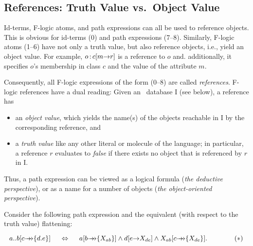\subsection{References: Truth Value vs.\ Object Value}\label{sec-references}

Id-terms, F-logic atoms, and path expressions can all be used to
reference objects. This is obvious for id-terms (0) and path
expressions (7--8). Similarly, F-logic atoms (1--6) have not only a
truth value, but also reference objects, i.e., yield an object value.
For example, $o\,{\bf{:}}\, c[m{\rightarrow} r]$ is a reference to $o$ and. additionally,
it specifies $o$'s membership in class $c$ and the value of the attribute $m$.

Consequently, all F-logic expressions of the form (0--8) are called
\emph{references}. F-logic references have a dual reading: Given an
\fl\ database \db I (see below), a reference has
\begin{itemize}
\item an \emph{object value}, which yields the name(s) of the objects
  reachable in \db I by the corresponding reference, and 
\item a \emph{truth value} like any other literal or molecule of the
  language; in particular, a reference $r$ evaluates to \emph{false} if
  there exists no object that is referenced by $r$ in \db I.
\end{itemize}
Thus, a path expression can be viewed as a logical formula
(\emph{the deductive perspective}), or as a name for a number of objects
(\emph{the object-oriented perspective}).

Consider the following path expression and the equivalent (with respect to
the truth value) flattening:

\begin{displaymath}
a..b[c\mvd\{d.e\}] \quad\ \Leftrightarrow \quad\  a[b\mvd\{X_{ab}\}]
\land d[e\fd X_{de}] \land X_{ab}[c\mvd\{X_{de}\}]. \hspace{4em} (*)
\end{displaymath}


